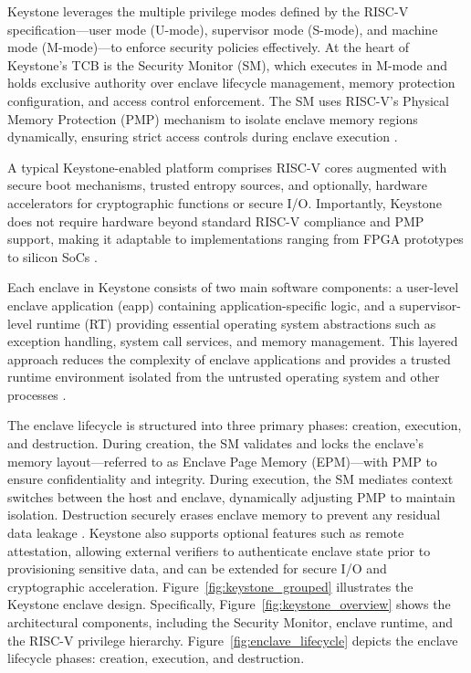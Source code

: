 Keystone leverages the multiple privilege modes defined by the RISC-V specification—user mode (U-mode), supervisor mode (S-mode), and machine mode (M-mode)—to enforce security policies effectively. At the heart of Keystone’s TCB is the Security Monitor (SM), which executes in M-mode and holds exclusive authority over enclave lifecycle management, memory protection configuration, and access control enforcement. The SM uses RISC-V’s Physical Memory Protection (PMP) mechanism to isolate enclave memory regions dynamically, ensuring strict access controls during enclave execution \cite{Lee2019}.

A typical Keystone-enabled platform comprises RISC-V cores augmented with secure boot mechanisms, trusted entropy sources, and optionally, hardware accelerators for cryptographic functions or secure I/O. Importantly, Keystone does not require hardware beyond standard RISC-V compliance and PMP support, making it adaptable to implementations ranging from FPGA prototypes to silicon SoCs \cite{Lee2019}.

Each enclave in Keystone consists of two main software components: a user-level enclave application (eapp) containing application-specific logic, and a supervisor-level runtime (RT) providing essential operating system abstractions such as exception handling, system call services, and memory management. This layered approach reduces the complexity of enclave applications and provides a trusted runtime environment isolated from the untrusted operating system and other processes \cite{Lee2019}.

The enclave lifecycle is structured into three primary phases: creation, execution, and destruction. During creation, the SM validates and locks the enclave’s memory layout—referred to as Enclave Page Memory (EPM)—with PMP to ensure confidentiality and integrity. During execution, the SM mediates context switches between the host and enclave, dynamically adjusting PMP to maintain isolation. Destruction securely erases enclave memory to prevent any residual data leakage \cite{Lee2019}. Keystone also supports optional features such as remote attestation, allowing external verifiers to authenticate enclave state prior to provisioning sensitive data, and can be extended for secure I/O and cryptographic acceleration.
Figure~\ref{fig:keystone_grouped} illustrates the Keystone enclave design. Specifically, Figure~\ref{fig:keystone_overview} shows the architectural components, including the Security Monitor, enclave runtime, and the RISC-V privilege hierarchy. Figure~\ref{fig:enclave_lifecycle} depicts the enclave lifecycle phases: creation, execution, and destruction.

